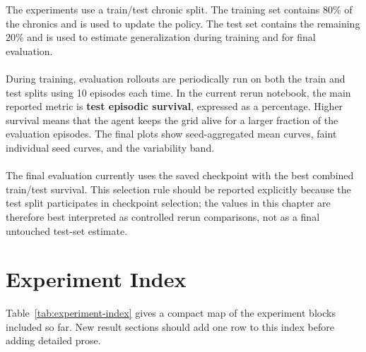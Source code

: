 The experiments use a train/test chronic split. The training set contains
80\% of the chronics and is used to update the policy. The test set contains
the remaining 20\% and is used to estimate generalization during training and
for final evaluation.
\\
\\
During training, evaluation rollouts are periodically run on both the train and
test splits using 10 episodes each time. In the current rerun notebook, the main
reported metric is \textbf{test episodic survival}, expressed as a percentage. 
Higher survival means that the agent keeps the grid alive for a larger fraction 
of the evaluation episodes. The final plots show seed-aggregated mean curves, 
faint individual seed curves, and the variability band.
\\
\\
The final evaluation currently uses the saved checkpoint with the best combined
train/test survival. This selection rule should be reported explicitly because
the test split participates in checkpoint selection; the values in this chapter
are therefore best interpreted as controlled rerun comparisons, not as a final
untouched test-set estimate.

\section{Experiment Index}
\label{sec:results-experiment-index}

Table~\ref{tab:experiment-index} gives a compact map of the experiment blocks
included so far. New result sections should add one row to this index before
adding detailed prose.

